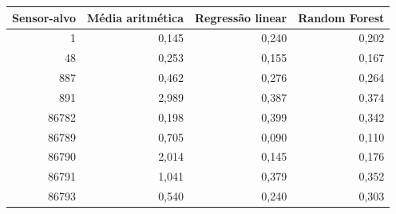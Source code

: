 \begin{tabular}{rrrr}
\toprule
Sensor-alvo & Média aritmética & Regressão linear & Random Forest \\
\midrule
1 & 0,145 & 0,240 & 0,202 \\
48 & 0,253 & 0,155 & 0,167 \\
887 & 0,462 & 0,276 & 0,264 \\
891 & 2,989 & 0,387 & 0,374 \\
86782 & 0,198 & 0,399 & 0,342 \\
86789 & 0,705 & 0,090 & 0,110 \\
86790 & 2,014 & 0,145 & 0,176 \\
86791 & 1,041 & 0,379 & 0,352 \\
86793 & 0,540 & 0,240 & 0,303 \\
\bottomrule
\end{tabular}
